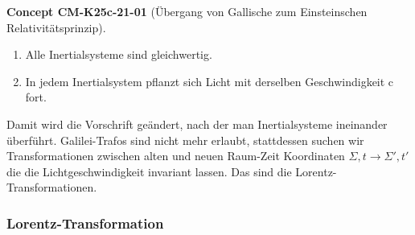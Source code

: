 \documentclass[10pt, letterpaper]{article}
\newcommand{\CustomHeading}[3]{%
  \par\medskip\noindent%
  \textbf{#1 #2} \textnormal{(#3)}.\enskip%
}
\newenvironment{CONC}[2]{\begin{unitbox}\CustomHeading{Concept}{#1}{#2}}{\end{unitbox}}
\begin{document}
\begin{CONC}{CM-K25c-21-01}{Übergang von Gallische zum Einsteinschen Relativitätsprinzip}
\begin{enumerate}
\item Alle Inertialsysteme sind gleichwertig.
\item In jedem Inertialsystem pflanzt sich Licht mit derselben Geschwindigkeit c fort.
\end{enumerate}

Damit wird die Vorschrift geändert, nach der man Inertialsysteme ineinander überführt. Galilei-Trafos sind nicht mehr erlaubt, stattdessen suchen wir Transformationen zwischen alten und neuen Raum-Zeit Koordinaten $\Sigma, t \to \Sigma', t'$ die die Lichtgeschwindigkeit invariant lassen. Das sind die Lorentz-Transformationen.
\end{CONC}


\pagebreak


\subsubsection*{Lorentz-Transformation}
\end{document}
